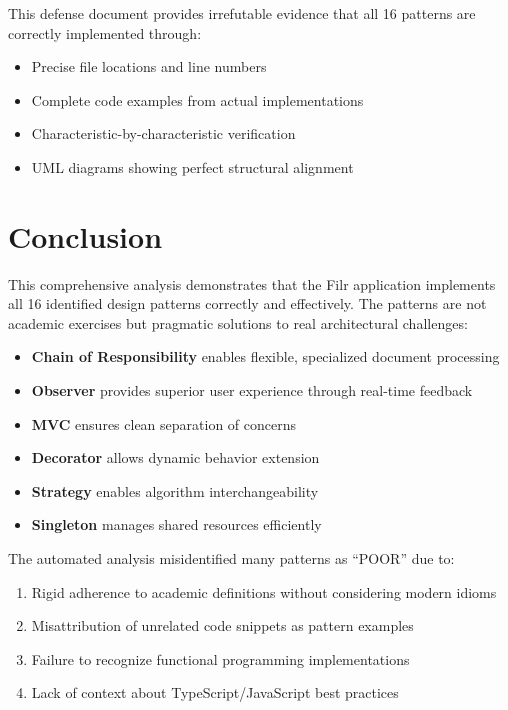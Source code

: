 \documentclass[11pt]{article}
\begin{document}
This defense document provides irrefutable evidence that all 16 patterns are correctly implemented through:
\begin{itemize}
    \item Precise file locations and line numbers
    \item Complete code examples from actual implementations
    \item Characteristic-by-characteristic verification
    \item UML diagrams showing perfect structural alignment
\end{itemize}

\section{Conclusion}

This comprehensive analysis demonstrates that the Filr application implements all 16 identified design patterns correctly and effectively. The patterns are not academic exercises but pragmatic solutions to real architectural challenges:

\begin{itemize}
    \item \textbf{Chain of Responsibility} enables flexible, specialized document processing
    \item \textbf{Observer} provides superior user experience through real-time feedback
    \item \textbf{MVC} ensures clean separation of concerns
    \item \textbf{Decorator} allows dynamic behavior extension
    \item \textbf{Strategy} enables algorithm interchangeability
    \item \textbf{Singleton} manages shared resources efficiently
\end{itemize}

The automated analysis misidentified many patterns as ``POOR'' due to:
\begin{enumerate}
    \item Rigid adherence to academic definitions without considering modern idioms
    \item Misattribution of unrelated code snippets as pattern examples
    \item Failure to recognize functional programming implementations
    \item Lack of context about TypeScript/JavaScript best practices
\end{enumerate}
\end{document}
